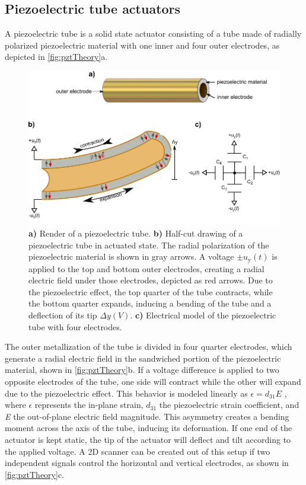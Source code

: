 \subsection{Piezoelectric tube actuators}
\label{ssec:piezo}
A piezoelectric tube is a solid state actuator consisting of a tube made of radially polarized piezoelectric material with one inner and four outer electrodes, as depicted in \autoref{fig:pztTheory}a. 
\begin{figure}[h!]
      \centering
      \includegraphics{figures/20_Theory/Mechanical/pztTheory.pdf}
      \caption{	\textbf{a)} Render of a piezoelectric tube.
      			\textbf{b)} Half-cut drawing of a piezoelectric tube in actuated state. The radial polarization of the piezoelectric material is shown in gray arrows. A voltage $\pm u_\mathrm{y}(t)$ is applied to the top and bottom outer electrodes, creating a radial electric field under those electrodes, depicted as red arrows. Due to the piezoelectric effect, the top quarter of the tube contracts, while the bottom quarter expands, inducing a bending of the tube and a deflection of its tip $\Delta y(V)$.
      			\textbf{c)} Electrical model of the piezoelectric tube with four electrodes.}
      \label{fig:pztTheory}
\end{figure}
The outer metallization of the tube is divided in four quarter electrodes, which generate a radial electric field in the sandwiched portion of the piezoelectric material, shown in \autoref{fig:pztTheory}b. If a voltage difference is applied to two opposite electrodes of the tube, one side will contract while the other will expand due to the piezoelectric effect. This behavior is modeled linearly  as $\epsilon = d_{31} E$ \cite{Arnau2008}, where $\epsilon$ represents the in-plane strain, $d_{31}$ the piezoelectric strain coefficient, and \textit{E} the out-of-plane electric field magnitude. This asymmetry creates a bending moment across the axis of the tube, inducing its deformation. If one end of the actuator is kept static, the tip of the actuator will deflect and tilt according to the applied voltage. A 2D scanner can be created out of this setup if two independent signals control the horizontal and vertical electrodes, as shown in \autoref{fig:pztTheory}c.

